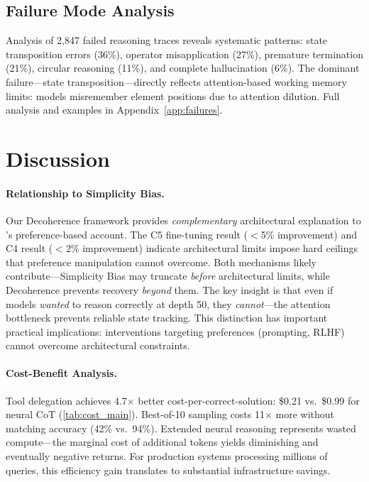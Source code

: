 \documentclass{article}
\theoremstyle{plain}
\theoremstyle{definition}
\theoremstyle{remark}
\begin{document}
\subsection{Failure Mode Analysis}

Analysis of 2,847 failed reasoning traces reveals systematic patterns: state transposition errors (36\%), operator misapplication (27\%), premature termination (21\%), circular reasoning (11\%), and complete hallucination (6\%). The dominant failure---state transposition---directly reflects attention-based working memory limits: models misremember element positions due to attention dilution. Full analysis and examples in Appendix~\ref{app:failures}.


\section{Discussion}
\label{sec:discussion}

\paragraph{Relationship to Simplicity Bias.} Our Decoherence framework provides \emph{complementary} architectural explanation to \citet{wu2025more}'s preference-based account. The C5 fine-tuning result ($<$5\% improvement) and C4 result ($<$2\% improvement) indicate architectural limits impose hard ceilings that preference manipulation cannot overcome. Both mechanisms likely contribute---Simplicity Bias may truncate \emph{before} architectural limits, while Decoherence prevents recovery \emph{beyond} them. The key insight is that even if models \emph{wanted} to reason correctly at depth 50, they \emph{cannot}---the attention bottleneck prevents reliable state tracking. This distinction has important practical implications: interventions targeting preferences (prompting, RLHF) cannot overcome architectural constraints.

\paragraph{Cost-Benefit Analysis.} Tool delegation achieves 4.7$\times$ better cost-per-correct-solution: \$0.21 vs.\ \$0.99 for neural CoT (\cref{tab:cost_main}). Best-of-10 sampling costs 11$\times$ more without matching accuracy (42\% vs.\ 94\%). Extended neural reasoning represents wasted compute---the marginal cost of additional tokens yields diminishing and eventually negative returns. For production systems processing millions of queries, this efficiency gain translates to substantial infrastructure savings.
\end{document}
